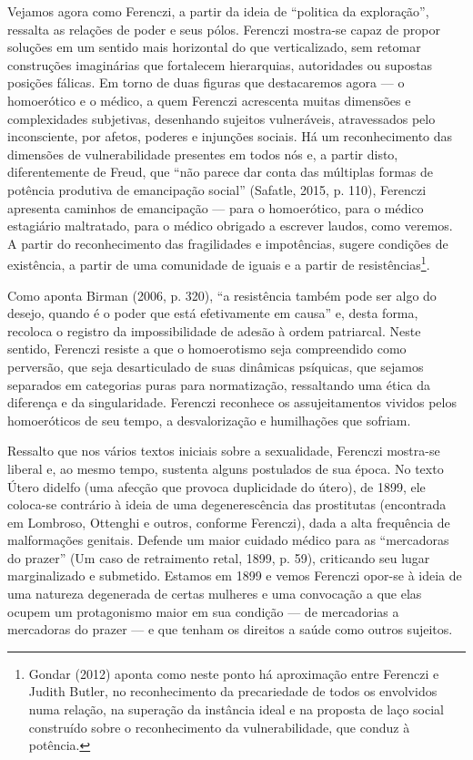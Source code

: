 Vejamos agora como Ferenczi, a partir da ideia de ``politica da
exploração'', ressalta as relações de poder e seus pólos. Ferenczi
mostra-se capaz de propor soluções em um sentido mais horizontal do que
verticalizado, sem retomar construções imaginárias que fortalecem
hierarquias, autoridades ou supostas posições fálicas. Em torno de duas
figuras que destacaremos agora --- o homoerótico e o médico, a quem
Ferenczi acrescenta muitas dimensões e complexidades subjetivas,
desenhando sujeitos vulneráveis, atravessados pelo inconsciente, por
afetos, poderes e injunções sociais. Há um reconhecimento das dimensões
de vulnerabilidade presentes em todos nós e, a partir disto,
diferentemente de Freud, que ``não parece dar conta das múltiplas formas
de potência produtiva de emancipação social'' (Safatle, 2015, p. 110),
Ferenczi apresenta caminhos de emancipação --- para o homoerótico, para o
médico estagiário maltratado, para o médico obrigado a escrever laudos,
como veremos. A partir do reconhecimento das fragilidades e impotências,
sugere condições de existência, a partir de uma comunidade de iguais e a
partir de resistências\footnote{Gondar (2012) aponta como neste ponto há
  aproximação entre Ferenczi e Judith Butler, no reconhecimento da
  precariedade de todos os envolvidos numa relação, na superação da
  instância ideal e na proposta de laço social construído sobre o
  reconhecimento da vulnerabilidade, que conduz à potência.}.

Como aponta Birman (2006, p. 320), ``a resistência também pode ser algo
do desejo, quando é o poder que está efetivamente em causa'' e, desta
forma, recoloca o registro da impossibilidade de adesão à ordem
patriarcal. Neste sentido, Ferenczi resiste a que o homoerotismo seja
compreendido como perversão, que seja desarticulado de suas dinâmicas
psíquicas, que sejamos separados em categorias puras para normatização,
ressaltando uma ética da diferença e da singularidade. Ferenczi
reconhece os assujeitamentos vividos pelos homoeróticos de seu tempo, a
desvalorização e humilhações que sofriam.

Ressalto que nos vários textos iniciais sobre a sexualidade, Ferenczi
mostra-se liberal e, ao mesmo tempo, sustenta alguns postulados de sua
época. No texto Útero didelfo (uma afecção que provoca duplicidade do
útero), de 1899, ele coloca-se contrário à ideia de uma degenerescência
das prostitutas (encontrada em Lombroso, Ottenghi e outros, conforme
Ferenczi), dada a alta frequência de malformações genitais. Defende um
maior cuidado médico para as ``mercadoras do prazer'' (Um caso de
retraimento retal, 1899, p. 59), criticando seu lugar marginalizado e
submetido. Estamos em 1899 e vemos Ferenczi opor-se à ideia de uma
natureza degenerada de certas mulheres e uma convocação a que elas
ocupem um protagonismo maior em sua condição --- de mercadorias a
mercadoras do prazer --- e que tenham os direitos a saúde como outros
sujeitos.

